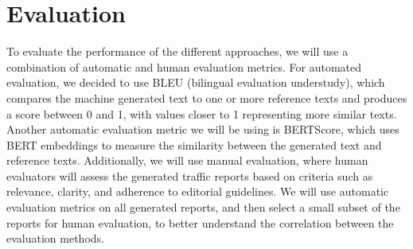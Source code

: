 \documentclass[fleqn,moreauthors,10pt]{ds_report}
\begin{document}
\section*{Evaluation}
To evaluate the performance of the different approaches, we will use a combination of automatic and human evaluation metrics.
For automated evaluation, we decided to use BLEU (bilingual evaluation understudy), which compares the machine generated text to one or more reference texts and produces a score between 0 and 1, with values closer to 1 representing more similar texts.
Another automatic evaluation metric we will be using is BERTScore, which uses BERT embeddings to measure the similarity between the generated text and reference texts.
Additionally, we will use manual evaluation, where human evaluators will assess the generated traffic reports based on criteria such as relevance, clarity, and adherence to editorial guidelines.
We will use automatic evaluation metrics on all generated reports, and then select a small subset of the reports for human evaluation, to better understand the correlation between the evaluation methods.


\end{document}
